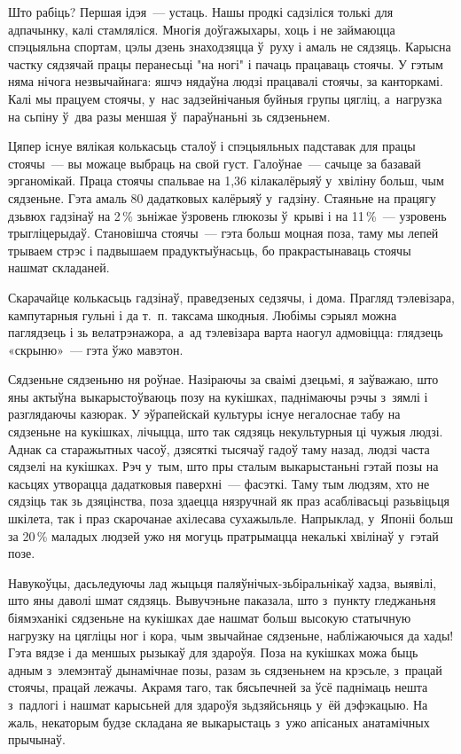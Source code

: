 Што рабіць? Першая ідэя~--- устаць. Нашы продкі садзіліся толькі для адпачынку, калі стамляліся. Многія доўгажыхары, хоць і не займаюцца спэцыяльна спортам, цэлы дзень знаходзяцца ў~руху і амаль не сядзяць. Карысна частку сядзячай працы перанесьці "на ногі" і пачаць працаваць стоячы. У гэтым няма нічога незвычайнага: яшчэ нядаўна людзі працавалі стоячы, за канторкамі. Калі мы працуем стоячы, у~нас задзейнічаныя буйныя групы цягліц, а~нагрузка на сьпіну ў~два разы меншая ў~параўнаньні зь сядзеньнем.

Цяпер існуе вялікая колькасьць сталоў і спэцыяльных падставак для працы стоячы~--- вы можаце выбраць на свой густ. Галоўнае~--- сачыце за базавай эрганомікай. Праца стоячы спальвае на 1,36 кілакалёрыяў у~хвіліну больш, чым сядзеньне. Гэта амаль 80 дадатковых калёрыяў у~гадзіну. Стаяньне на працягу дзьвюх гадзінаў на 2\,\% зьніжае ўзровень глюкозы ў~крыві і на 11\,\%~--- узровень трыгліцерыдаў. Становішча стоячы~--- гэта больш моцная поза, таму мы лепей трываем стрэс і падвышаем прадуктыўнасьць, бо пракрастынаваць стоячы нашмат складаней.

Скарачайце колькасьць гадзінаў, праведзеных седзячы, і дома. Прагляд тэлевізара, кампутарныя гульні і да т.~п. таксама шкодныя. Любімы сэрыял можна паглядзець і зь велатрэнажора, а~ад тэлевізара варта наогул адмовіцца: глядзець «скрыню»~--- гэта ўжо мавэтон.

Сядзеньне сядзеньню ня роўнае. Назіраючы за сваімі дзецьмі, я заўважаю, што яны актыўна выкарыстоўваюць позу на кукішках, паднімаючы рэчы з~зямлі і разглядаючы казюрак. У эўрапейскай культуры існуе негалоснае табу на сядзеньне на кукішках, лічыцца, што так сядзяць некультурныя ці чужыя людзі. Аднак са старажытных часоў, дзясяткі тысячаў гадоў таму назад, людзі часта сядзелі на кукішках. Рэч у~тым, што пры сталым выкарыстаньні гэтай позы на касьцях утворацца дадатковыя паверхні~--- фасэткі. Таму тым людзям, хто не сядзіць так зь дзяцінства, поза здаецца нязручнай як праз асаблівасьці разьвіцьця шкілета, так і праз скарочанае ахілесава сухажыльле. Напрыклад, у~Японіі больш за 20\,\% маладых людзей ужо ня могуць пратрымацца некалькі хвілінаў у~гэтай позе.

Навукоўцы, дасьледуючы лад жыцьця паляўнічых-зьбіральнікаў хадза, выявілі, што яны даволі шмат сядзяць. Вывучэньне паказала, што з~пункту гледжаньня біямэханікі сядзеньне на кукішках дае нашмат больш высокую статычную нагрузку на цягліцы ног і кора, чым звычайнае сядзеньне, набліжаючыся да хады! Гэта вядзе і да меншых рызыкаў для здароўя. Поза на кукішках можа быць адным з~элемэнтаў дынамічнае позы, разам зь сядзеньнем на крэсьле, з~працай стоячы, працай лежачы. Акрамя таго, так бясьпечней за ўсё паднімаць нешта з~падлогі і нашмат карысьней для здароўя зьдзяйсьняць у~ёй дэфэкацыю. На жаль, некаторым будзе складана яе выкарыстаць з~ужо апісаных анатамічных прычынаў.

